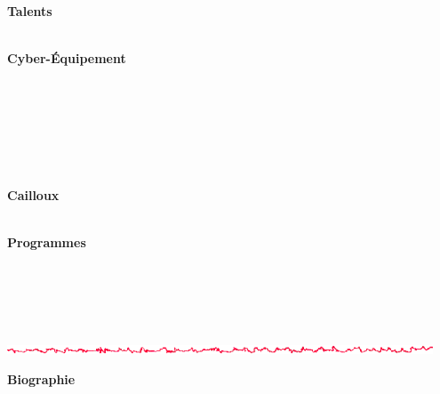\begin{minipage}[ht]{0.10\textwidth}
	~\\
\end{minipage} \hfill \begin{minipage}[ht]{0.38\textwidth}

	\textbf{\large Talents}~\\
	\CApersoTALENT ~\\
	
\end{minipage} \hfill \begin{minipage}[ht]{0.38\textwidth}
	
	\textbf{\large Cyber-{\'E}quipement}~\\
	\CApersoCYBEQU ~\\
	
\end{minipage} \hfill \begin{minipage}[ht]{0.10\textwidth}
	~\\
\end{minipage} ~\\



\begin{minipage}[ht]{0.10\textwidth}
	~\\
\end{minipage} \hfill \begin{minipage}[ht]{0.38\textwidth}

	\textbf{\large Cailloux}~\\
	\CApersoCAILLO ~\\

\end{minipage} \hfill \begin{minipage}[ht]{0.38\textwidth}

	\textbf{\large Programmes}~\\
	\CApersoPROGRA ~\\
	
\end{minipage} \hfill \begin{minipage}[ht]{0.10\textwidth}
	~\\
\end{minipage} ~\\

	\begin{center}
		\includegraphics[width=0.95\textwidth]{Filet_CA.png}
	\end{center}

\textbf{\large Biographie}~\\
\CApersoBIOLIG ~\\
\CApersoBIOBIO ~\\


